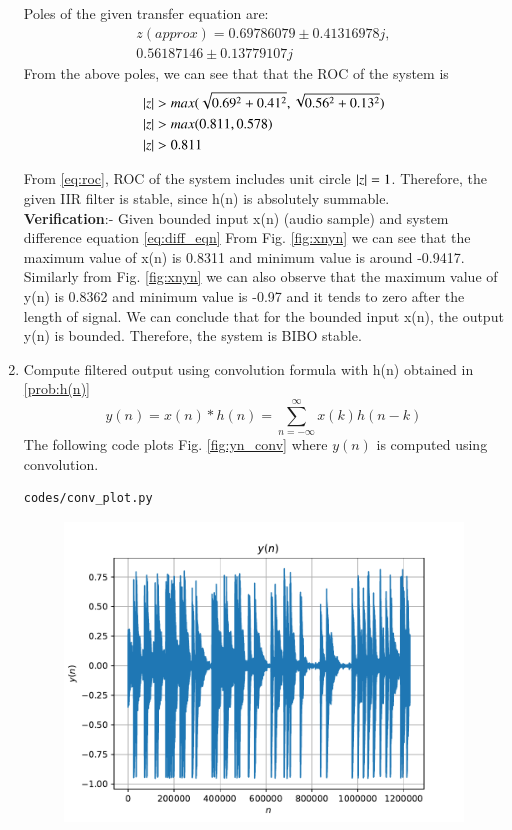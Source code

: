 \documentclass[journal,12pt,twocolumn]{IEEEtran}
\renewcommand\thesection{\arabic{section}}
\begin{document}
\begin{enumerate}[label=\thesection.\arabic*,ref=\thesection.\theenumi]
Poles of the given transfer equation are:
\begin{equation}
\begin{split}
z(approx) = 0.69786079 \pm 0.41316978j,
\\
0.56187146 \pm 0.13779107j
\end{split}  
\end{equation}
From the above poles, we can see that that the ROC of the system is
\begin{align}
\left\vert z\right\vert&> max(\sqrt{0.69^{2}+0.41^{2}},\sqrt{0.56^{2}+0.13^{2}})
\\
\left\vert z\right\vert&> max(0.811,0.578)
\\
\left\vert z\right\vert&> 0.811
\label{eq:roc}
\end{align}

From \eqref{eq:roc}, ROC of the system includes unit circle $\left\vert z\right\vert=1$. Therefore, the given IIR filter is stable, since h(n) is absolutely summable.
\\
\textbf{Verification}:-
Given bounded input x(n) (audio sample) and system difference equation \eqref{eq:diff_eqn}
From Fig. \ref{fig:xnyn} we can see that the maximum value of x(n) is 0.8311 and minimum value is around -0.9417.
Similarly from Fig. \ref{fig:xnyn} we can also observe that the maximum value of y(n) is 0.8362 and minimum value is -0.97 and it tends to zero after the length of signal.
We can conclude that for the bounded input x(n), the output
y(n) is bounded. Therefore, the system is BIBO stable.
\\
\item Compute filtered output using convolution formula with h(n) obtained in \ref{prob:h(n)}
%
\begin{equation}
\label{eq:convolution}
y(n) = x(n)*h(n) = \sum_{n=-\infty}^{\infty}x(k)h(n-k)
\end{equation}
\solution The following code plots Fig. \ref{fig:yn_conv} where $y(n)$ is computed using convolution.
%
\begin{lstlisting}
codes/conv_plot.py
\end{lstlisting}
\begin{figure}[!ht]
\centering
\includegraphics[width=\columnwidth]{./figs/yn_conv}

\end{figure}
\end{enumerate}
\end{document}
